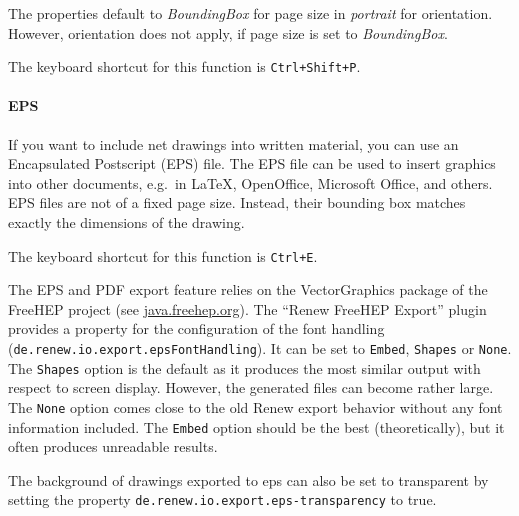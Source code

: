 The properties default to \emph{BoundingBox} for page size in \emph{portrait} for orientation.
However, orientation does not apply, if page size is set to \emph{BoundingBox}.

The keyboard shortcut for this function is \texttt{Ctrl+Shift+P}.

\paragraph{EPS}

If you want to include net drawings into written material,
you can use an Encapsulated Post\-script (EPS) file. The EPS file
can be used to insert graphics into other documents,
e.g.\ in LaTeX, OpenOffice, Microsoft Office, and others.
EPS files are not of a fixed page size.
Instead, their bounding box matches exactly the dimensions of the drawing.

The keyboard shortcut for this function is \texttt{Ctrl+E}.

The EPS and PDF export feature relies on the VectorGraphics
package of the FreeHEP project (see \url{java.freehep.org}). The ``Renew FreeHEP Export'' plugin provides a property for the configuration of the font handling (\texttt{de.renew.io.export.epsFontHandling}). It
can be set to \texttt{Embed}, \texttt{Shapes} or \texttt{None}.
The \texttt{Shapes} option is the default as it produces the most
similar output with respect to screen display.
However, the generated files can become rather large.
The \texttt{None} option comes close to the old Renew export behavior
without any font information included.
The \texttt{Embed} option should be the best (theoretically), but it
often produces unreadable results.

The background of drawings exported to eps can also be set to transparent 
by setting the property \texttt{de.renew.io.export.eps-transparency} to true. 

%

